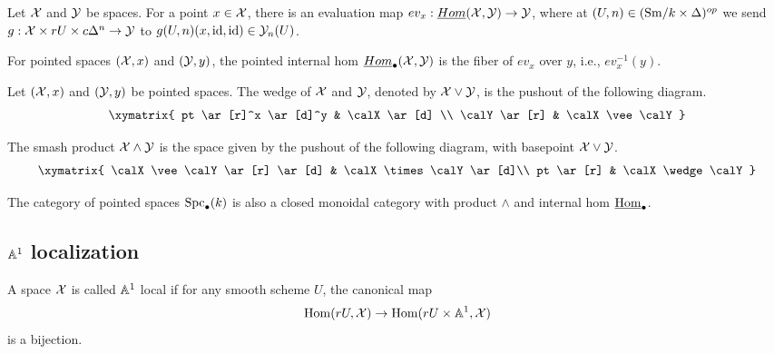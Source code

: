 \documentclass{amsart}%
\begin{document}
\begin{definition}
  \label{pointed-hom}
  Let $\mathcal{X}$ and $\mathcal{Y}$ be spaces. For a point $x \in \mathcal{X}$, there
  is an evaluation map
  $ev_x : \underline{Hom}(\mathcal{X}, \mathcal{Y}) \to \mathcal{Y}$, where at
  $(U,n) \in (\mathrm{Sm}/k \times \Delta)^{op}$ we send
  $g : \mathcal{X} \times rU \times c\Delta^n \to \mathcal{Y}$ to
  $g(U,n)(x, \operatorname{id}, \operatorname{id}) \in \mathcal{Y}_n(U)$.

  For pointed spaces $(\mathcal{X}, x)$ and $(\mathcal{Y}, y)$, the pointed
  internal hom $\underline{Hom}_{\bullet}(\mathcal{X}, \mathcal{Y})$ is the fiber
  of $ev_x$ over $y$, i.e., $ev_{x}^{-1}(y)$.
\end{definition}

\begin{definition}
  Let $(\mathcal{X}, x)$ and $(\mathcal{Y}, y)$ be pointed spaces. The wedge of
  $\mathcal{X}$ and $\mathcal{Y}$, denoted by $\mathcal{X} \vee \mathcal{Y}$, is the pushout
  of the following diagram.
  \begin{equation*}
    \xymatrix{
      pt \ar[r]^x \ar[d]^y & \calX \ar[d] \\
      \calY \ar[r] & \calX \vee \calY
      }
  \end{equation*}

  The smash product $\mathcal{X} \wedge \mathcal{Y}$ is the
  space given by the pushout of the following diagram, with basepoint
  $\mathcal{X} \vee \mathcal{Y}$.
  \begin{equation*}
    \xymatrix{
      \calX \vee \calY \ar[r] \ar[d] & \calX \times \calY \ar[d]\\
      pt \ar[r] & \calX \wedge \calY
      }
  \end{equation*}

\end{definition}


\begin{proposition}
  The category of pointed spaces $\mathrm{Spc}_{\bullet}(k)$ is also a closed
  monoidal category with product $\wedge$ and internal hom
  $\underline{\operatorname{Hom}}_{\bullet}$.
\end{proposition}


\subsection{$\mathbb{A}^1$ localization}

\begin{definition} A space $\mathcal{X}$ is called $\mathbb{A}^1$ local if for any
  smooth scheme $U$, the canonical map
  \begin{equation*}
    \operatorname{Hom}(rU, \mathcal{X}) \to \operatorname{Hom}(rU\times \mathbb{A}^1, \mathcal{X})
  \end{equation*}
  is a bijection. 
\end{definition}
\end{document}
